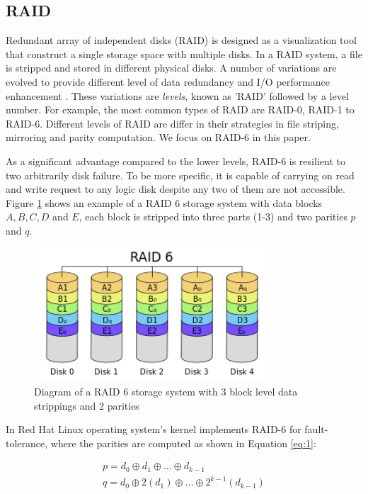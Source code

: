 \subsection{RAID}
Redundant array of independent disks (RAID) is designed as a visualization tool that construct a single storage space with multiple disks. In a RAID system, a file is stripped and stored in different physical disks. A number of variations are evolved to provide different level of data redundancy and I/O performance enhancement \cite{arpaci2012operating}. These variations are \textit{levels}, known as 'RAID' followed by a level number. For example, the most common types of RAID are RAID-0, RAID-1 to RAID-6. Different levels of RAID are differ in their strategies in file striping, mirroring and parity computation. We focus on RAID-6 in this paper.

As a significant advantage compared to the lower levels, RAID-6 is resilient to two arbitrarily disk failure. To be more specific, it is capable of carrying on read and write request to any logic disk despite any two of them are not accessible. Figure \ref{fig:raid6} shows an example of a RAID 6 storage system with data blocks $A, B, C, D$ and $E$, each block is stripped into three parts (1-3) and two parities $p$ and $q$. 

\begin{figure}[t]
	\includegraphics[width=9cm,height=5cm,angle=0]{RAID6.png}
	\caption{Diagram of a RAID 6 storage system with 3 block level data strippings and 2 parities \cite{wiki:raid} }
	\label{fig:raid6}
\end{figure}

In Red Hat Linux operating system's kernel implements RAID-6 for fault-tolerance, where the parities are computed as shown in Equation \ref{eq:1}:

\begin{equation} \label{eq:1}
\begin{array}{lcr} p = d_0 \oplus d_1 \oplus ... \oplus d_{k-1} \\
q = d_0 \oplus 2(d_1) \oplus ... \oplus 2^{k-1}(d_{k-1}) 
\end{array}
\end{equation}


